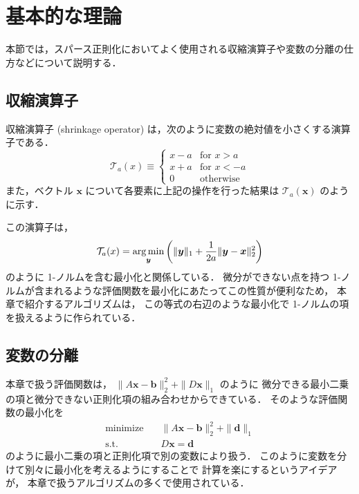 %

\section{基本的な理論}

本節では，スパース正則化においてよく使用される収縮演算子や変数の分離の仕方などについて説明する．

\subsection{収縮演算子}\label{sec:regularization_shrinkage-operator}

収縮演算子 (shrinkage operator)
は，次のように変数の絶対値を小さくする演算子である．
\begin{equation}
    \mathcal{T}_a(x) \equiv
    \begin{cases}
        x - a & \text{for $x > a$}  \\
        x + a & \text{for $x < -a$} \\
        0     & \text{otherwise}
    \end{cases}
\end{equation}
また，ベクトル $\bm{x}$ について各要素に上記の操作を行った結果は
$\mathcal{T}_a(\bm{x})$ のように示す．

この演算子は，
\begin{equation}
    \mathcal{T}_a(x) =
    \operatorname*{arg \thinspace min}_{\bm{y}} \left(
    \|\bm{y}\|_1 + \frac{1}{2a} \|\bm{y} - \bm{x}\|_2^2
    \right)
\end{equation}
のように 1-ノルムを含む最小化と関係している．
微分ができない点を持つ 1-ノルムが含まれるような評価関数を最小化にあたってこの性質が便利なため，
本章で紹介するアルゴリズムは，
この等式の右辺のような最小化で 1-ノルムの項を扱えるように作られている．

\subsection{変数の分離}

本章で扱う評価関数は，
$\|A \bm{x} - \bm{b}\|_2^2 + \|D \bm{x}\|_1$ のように
微分できる最小二乗の項と微分できない正則化項の組み合わせからできている．
そのような評価関数の最小化を
\begin{align}
    \text{minimize} \hspace{1em} & \|A \bm{x} - \bm{b}\|_2^2 + \|\bm{d}\|_1 \\
    \text{s.t.} \hspace{1em}     & D \bm{x} = \bm{d}
\end{align}
のように最小二乗の項と正則化項で別の変数により扱う．
このように変数を分けて別々に最小化を考えるようにすることで
計算を楽にするというアイデアが，
本章で扱うアルゴリズムの多くで使用されている．
